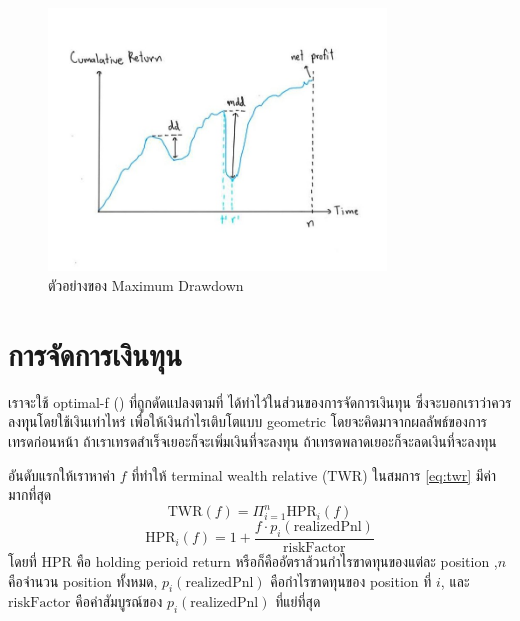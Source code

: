 \begin{figure}[ht]
    \centering
    \includegraphics[width=0.8\textwidth]{images/mdd.jpg}
    \caption{ตัวอย่างของ Maximum Drawdown}
    \label{fig:10}
\end{figure}

\section{การจัดการเงินทุน}
เราจะใช้ optimal-f (\cite{Vince}) ที่ถูกดัดแปลงตามที่ \cite{Rodrigo} ได้ทำไว้ในส่วนของการจัดการเงินทุน ซึ่งจะบอกเราว่าควรลงทุุนโดยใช้เงินเท่าไหร่ เพื่อให้เงินกำไรเติบโตแบบ
geometric โดยจะคิดมาจากผลลัพธ์ของการเทรดก่อนหน้า ถ้าเราเทรดสำเร็จเยอะก็จะเพิ่มเงินที่จะลงทุน ถ้าเทรดพลาดเยอะก็จะลดเงินที่จะลงทุน 

อันดับแรกให้เราหาค่า $f$ ที่ทำให้ terminal wealth relative ($\text{TWR}$) ในสมการ \ref{eq:twr} มีค่ามากที่สุด
\begin{equation}
    \text{TWR}(f) = \Pi_{i=1}^{n} \text{HPR}_i(f)
\label{eq:twr}
\end{equation}
\begin{equation}
    \text{HPR}_i(f) = 1 + \frac{f \cdot p_i(\text{realizedPnl})}{\text{riskFactor}}
\end{equation}
โดยที่ $\text{HPR}$ คือ holding perioid return หรือก็คืออัตราส้วนกำไรขาดทุนของแต่ละ position 
,$n$ คือจำนวน position ทั้งหมด, $p_i(\text{realizedPnl})$ คือกำไรขาดทุนของ position ที่ $i$, 
และ $\text{riskFactor}$ คือค่าสัมบูรณ์ของ $p_i(\text{realizedPnl})$ ที่แย่ที่สุด

